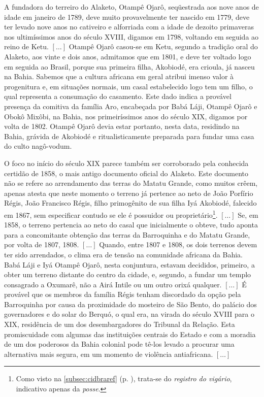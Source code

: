 \begin{citacao}
A fundadora do terreiro do Alaketo, Otampê Ojarô, seqüestrada aos nove anos de idade em janeiro de 1789, deve muito provavelmente ter nascido em 1779, deve ter levado nove anos no cativeiro e alforriada com a idade de dezoito primaveras nos ultimíssimos anos do século XVIII, digamos em 1798, voltando em seguida ao reino de Ketu. \([\dots]\) Otampê Ojarô casou-se em Ketu, segundo a tradição oral do Alaketo, aos vinte e dois anos, admitamos que em 1801, e deve ter voltado logo em seguida ao Brasil, porque sua primeira filha, Akobiodé, era crioula, já nasceu na Bahia. Sabemos que a cultura africana em geral atribui imenso valor à progenitura e, em situações normais, um casal estabelecido logo tem um filho, o qual representa a consumação do casamento. Este dado indica a provável presença da comitiva da família Aro, encabeçada por Babá Láji, Otampê Ojarô e Obokô Mixôbi, na Bahia, nos primeiríssimos anos do século XIX, digamos por volta de 1802. Otampê Ojarô devia estar portanto, nesta data, residindo na Bahia, grávida de Akobiodé e ritualisticamente preparada para fundar uma casa do culto nagô-vodum.

O foco no início do século XIX parece também ser corroborado pela conhecida certidão de 1858, o mais antigo documento oficial do Alaketo. Este documento não se refere ao arrendamento das terras do Matatu Grande, como muitos crêem, apenas atesta que neste momento o terreno já pertence ao neto de João Porfírio Régis, João Francisco Régis, filho primogênito de sua filha Iyá Akobiodé, falecido em 1867, sem especificar contudo se ele é possuidor ou proprietário\footnote{Como visto na \autoref{subsec:cidbraref} (p. \pageref{subsec:cidbraref}), trata-se do \textit{registro do vigário}, indicativo apenas da \textit{posse}.}. \([\dots]\) Se, em 1858, o terreno pertencia ao neto do casal que inicialmente o obteve, tudo aponta para a concomitante obtenção das terras da Barroquinha e do Matatu Grande, por volta de 1807, 1808. \([\dots]\) Quando, entre 1807 e 1808, os dois terrenos devem ter sido arrendados, o clima era de tensão na comunidade africana da Bahia. Babá Láji e Iyá Otampê Ojarô, nesta conjuntura, estavam decididos, primeiro, a obter um terreno distante do centro da cidade, e, segundo, a fundar um templo consagrado a Oxumarê, não a Airá Intile ou um outro orixá qualquer. \([\dots]\) É provável que os membros da família Régis tenham discordado da opção pela Barroquinha por causa da proximidade do mosteiro de São Bento, do palácio dos governadores e do solar do Berquó, o qual era, na virada do século XVIII para o XIX, residência de um dos desembargadores do Tribunal da Relação. Esta promiscuidade com algumas das instituições centrais do Estado e com a moradia de um dos poderosos da Bahia colonial pode tê-los levado a procurar uma alternativa mais segura, em um momento de violência antiafricana. \([\dots]\)


\end{citacao}
